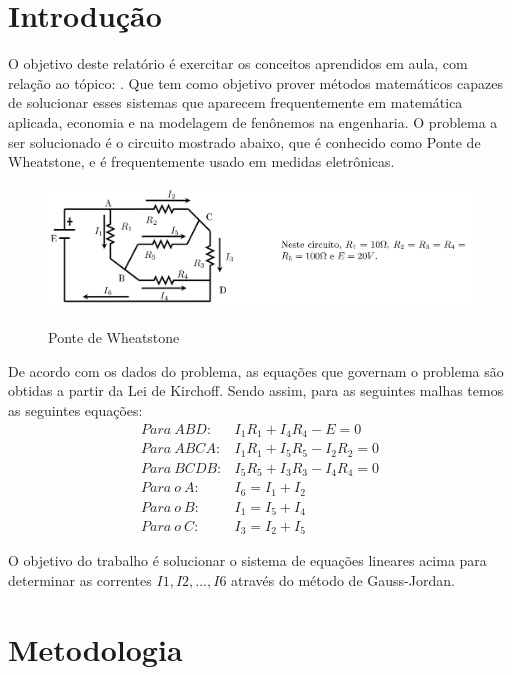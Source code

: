 \documentclass[12pt, hidelinks]{article}
\makeatletter
\let\thetitle\@title
\makeatother
\begin{document}
\section{Introdução}

O objetivo deste relatório é exercitar os conceitos aprendidos em aula, com relação ao tópico: \thetitle.
Que tem como objetivo prover métodos matemáticos capazes de solucionar esses sistemas que aparecem frequentemente
em matemática aplicada, economia e na modelagem de fenônemos na engenharia.
O problema a ser solucionado é o circuito mostrado abaixo, que é conhecido como Ponte de Wheatstone, e é frequentemente usado em medidas eletrônicas.

\begin{figure}[!h]
  \centering
  \includegraphics[width=15cm]{figuras/problema.png}\\
  \caption{Ponte de Wheatstone}\label{fig:ponte}
\end{figure}

De acordo com os dados do problema, as equações que governam o problema são obtidas a partir da Lei de Kirchoff.
Sendo assim, para as seguintes malhas temos as seguintes equações:
\begin{eqnarray}\label{eq:sistema}
  Para~ABD: & I_1R_1+I_4R_4-E=0 \nonumber\\
  Para~ABCA: & I_1R_1+I_5R_5-I_2R_2=0 \nonumber\\
  Para~BCDB: & I_5R_5+I_3R_3-I_4R_4=0 \nonumber\\
  Para~o~A: & I_6=I_1+I_2 \nonumber\\
  Para~o~B: & I_1=I_5+I_4 \nonumber\\
  Para~o~C: & I_3=I_2+I_5 \nonumber
\end{eqnarray}

O objetivo do trabalho é solucionar o sistema de equações lineares acima para determinar as correntes
$I1, I2,...,I6$ através do método de Gauss-Jordan.

\section{Metodologia}
\end{document}
